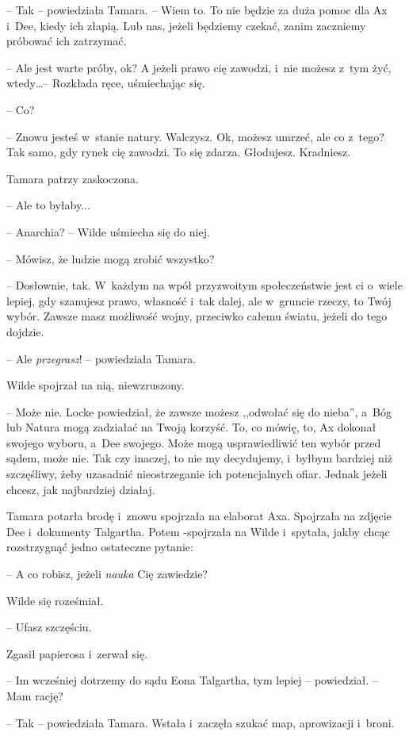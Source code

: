 \documentclass[oneside,polish,11pt,sfheadings]{mwbk}
\begin{document}
-- Tak -- powiedziała Tamara. -- Wiem to. To nie będzie za duża pomoc dla
Ax i~Dee, kiedy ich złapią. Lub nas, jeżeli będziemy czekać, zanim
zaczniemy próbować ich zatrzymać.

-- Ale jest warte próby, ok? A jeżeli prawo cię zawodzi, i~nie możesz z~tym żyć, wtedy\ldots -- Rozkłada ręce, uśmiechając się.

-- Co?

-- Znowu jesteś w~stanie natury. Walczysz. Ok, możesz umrzeć, ale co z~tego? Tak samo, gdy rynek cię zawodzi. To się zdarza. Głodujesz.
Kradniesz.

Tamara patrzy zaskoczona.

-- Ale to byłaby...

-- Anarchia? -- Wilde uśmiecha się do niej.

-- Mówisz, że ludzie mogą zrobić wszystko?

-- Dosłownie, tak. W~każdym na wpół przyzwoitym społeczeństwie jest ci o~wiele lepiej, gdy szanujesz prawo, własność i~tak dalej, ale w~gruncie
rzeczy, to Twój wybór. Zawsze masz możliwość wojny, przeciwko całemu
światu, jeżeli do tego dojdzie.

-- Ale \emph{przegrasz}! -- powiedziała Tamara.

Wilde spojrzał na nią, niewzruszony.

-- Może nie. Locke powiedział, że zawsze możesz ,,odwołać się do nieba'', a~Bóg lub Natura mogą zadziałać na Twoją korzyść. To, co mówię, to, Ax
dokonał swojego wyboru, a~Dee swojego. Może mogą usprawiedliwić ten
wybór przed sądem, może nie. Tak czy inaczej, to nie my decydujemy, i~byłbym bardziej niż szczęśliwy, żeby uzasadnić nieostrzeganie ich
potencjalnych ofiar. Jednak jeżeli chcesz, jak najbardziej działaj.

Tamara potarła brodę i~znowu spojrzała na elaborat Axa. Spojrzała na
zdjęcie Dee i~dokumenty Talgartha. Potem -spojrzała na Wilde i~spytała,
jakby chcąc rozstrzygnąć jedno ostateczne pytanie: 

-- A co robisz, jeżeli
\emph{nauka} Cię zawiedzie?

Wilde się roześmiał. 

-- Ufasz szczęściu.

Zgasił papierosa i~zerwał się.

-- Im wcześniej dotrzemy do sądu Eona Talgartha, tym lepiej -- powiedział.
-- Mam rację?

-- Tak -- powiedziała Tamara. Wstała i~zaczęła szukać map, aprowizacji i~broni.
\end{document}
